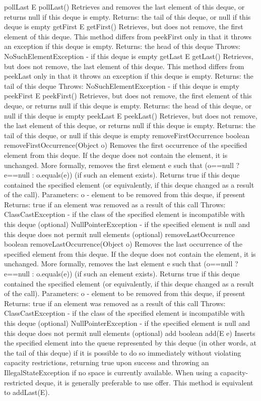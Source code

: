 \documentclass{book}
\begin{document}
pollLast
E pollLast()
Retrieves and removes the last element of this deque, or returns null if this deque is empty.
Returns:
the tail of this deque, or null if this deque is empty
getFirst
E getFirst()
Retrieves, but does not remove, the first element of this deque. This method differs from peekFirst only in that it throws an exception if this deque is empty.
Returns:
the head of this deque
Throws:
NoSuchElementException - if this deque is empty
getLast
E getLast()
Retrieves, but does not remove, the last element of this deque. This method differs from peekLast only in that it throws an exception if this deque is empty.
Returns:
the tail of this deque
Throws:
NoSuchElementException - if this deque is empty
peekFirst
E peekFirst()
Retrieves, but does not remove, the first element of this deque, or returns null if this deque is empty.
Returns:
the head of this deque, or null if this deque is empty
peekLast
E peekLast()
Retrieves, but does not remove, the last element of this deque, or returns null if this deque is empty.
Returns:
the tail of this deque, or null if this deque is empty
removeFirstOccurrence
boolean removeFirstOccurrence(Object o)
Removes the first occurrence of the specified element from this deque. If the deque does not contain the element, it is unchanged. More formally, removes the first element e such that (o==null ? e==null : o.equals(e)) (if such an element exists). Returns true if this deque contained the specified element (or equivalently, if this deque changed as a result of the call).
Parameters:
o - element to be removed from this deque, if present
Returns:
true if an element was removed as a result of this call
Throws:
ClassCastException - if the class of the specified element is incompatible with this deque (optional)
NullPointerException - if the specified element is null and this deque does not permit null elements (optional)
removeLastOccurrence
boolean removeLastOccurrence(Object o)
Removes the last occurrence of the specified element from this deque. If the deque does not contain the element, it is unchanged. More formally, removes the last element e such that (o==null ? e==null : o.equals(e)) (if such an element exists). Returns true if this deque contained the specified element (or equivalently, if this deque changed as a result of the call).
Parameters:
o - element to be removed from this deque, if present
Returns:
true if an element was removed as a result of this call
Throws:
ClassCastException - if the class of the specified element is incompatible with this deque (optional)
NullPointerException - if the specified element is null and this deque does not permit null elements (optional)
add
boolean add(E e)
Inserts the specified element into the queue represented by this deque (in other words, at the tail of this deque) if it is possible to do so immediately without violating capacity restrictions, returning true upon success and throwing an IllegalStateException if no space is currently available. When using a capacity-restricted deque, it is generally preferable to use offer.
This method is equivalent to addLast(E).
\end{document}
